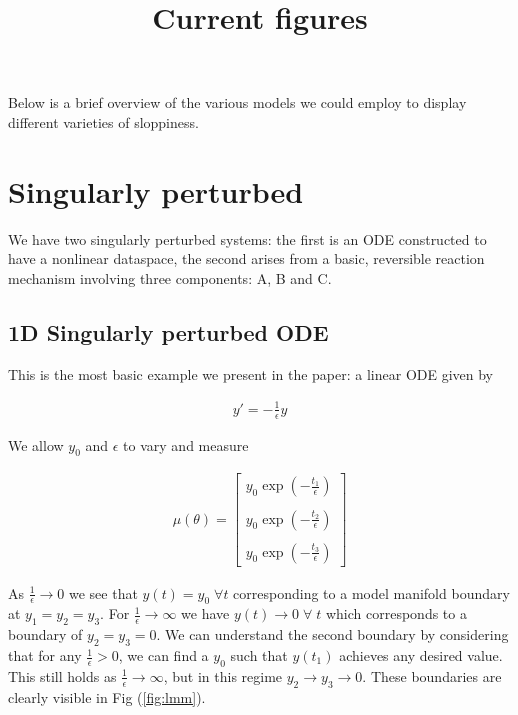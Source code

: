 \documentclass[11pt]{article}
\title{Current figures}
\begin{document}
\maketitle

Below is a brief overview of the various models we could employ to display different varieties of sloppiness.

\section{Singularly perturbed}

We have two singularly perturbed systems: the first is an ODE
constructed to have a nonlinear dataspace, the second arises from a
basic, reversible reaction mechanism involving three components: A, B
and C.

\subsection{1D Singularly perturbed ODE}

This is the most basic example we present in the paper: a linear ODE
given by

\begin{align}
  y' = -\frac{1}{\epsilon} y
  \label{1D-model}
\end{align}

We allow $y_0$ and $\epsilon$ to vary and measure

\begin{align*}
  \mu(\theta) = \begin{bmatrix} y_0 \exp(-\frac{t_1}{\epsilon}) \\ \\ y_0
    \exp(-\frac{t_2}{\epsilon}) \\ \\ y_0 \exp(-\frac{t_3}{\epsilon}) \end{bmatrix}
\end{align*}

As $\frac{1}{\epsilon} \rightarrow 0$ we see that $y(t) = y_0 \;
\forall t$ corresponding to a model manifold boundary at $y_1 = y_2 =
y_3$. For $\frac{1}{\epsilon} \rightarrow \infty$ we have
$y(t) \rightarrow 0 \; \forall \; t$ which corresponds to a boundary
of $y_2 = y_3 = 0$. We can understand the second boundary by
considering that for any $\frac{1}{\epsilon} > 0$, we can find a $y_0$
such that $y(t_1)$ achieves any desired value. This still holds as
$\frac{1}{\epsilon} \rightarrow \infty$, but in this regime $y_2
\rightarrow y_3 \rightarrow 0$. These boundaries are clearly visible
in Fig (\ref{fig:lmm}).
\end{document}
